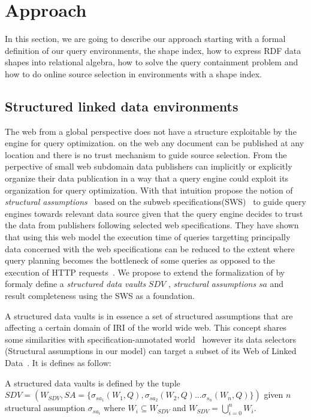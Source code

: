 \section{Approach}

In this section, we are going to describe our approach starting with a formal definition of our query environments,
the shape index, how to express RDF data shapes into relational algebra, how to solve the query containment problem
and how to do online source selection in environments with a shape index.

\subsection{Structured linked data environments}
The web from a global perspective does not have a structure exploitable by the engine for query optimization.
on the web any document can be published at any location and there is no trust mechanism to guide source selection.
From the perpective of small web subdomain data publishers can implicitly or explicitly organize their data publication in a way that a query engine could exploit 
its organization for query optimization.
With that intuition \citeauthor{Taelman2023} propose the notion of \emph{structural assumptions}~\cite{Taelman2023} based on the subweb specifications(SWS)~\cite{Bogaerts2021LinkTW}
to guide query engines towards relevant data source given that the query engine decides to trust the data from publishers following selected web specifications.
They have shown that using this web model the execution time of queries targetting principally data concerned with the web specifications can 
be reduced to the extent where query planning becomes the bottleneck of some queries as opposed to the execution of HTTP requests~\cite{Taelman2023}.
We propose to extend the formalization of \citeauthor{Taelman2023} by formaly define a \emph{structured data vaults} $SDV$ , \emph{structural assumptions} $sa$ and result completeness 
using the SWS as a foundation.

A structured data vaults is in essence a set of structured assumptions that are affecting a certain domain of IRI of the world wide web.
This concept shares some similarities with specification-annotated world~\cite{Bogaerts2021LinkTW} however its data selectors (Structural assumptions in our model) can target a subset of
its Web of Linked Data~\cite{Bogaerts2021LinkTW}.
It is defines as follow:

\begin{definition}\label{def:structuredDataVaults}
A structured data vaults is defined by the tuple~\newline $SDV = (W_{SDV}, SA = \{\sigma_{sa_1}(W_1, Q), \sigma_{sa_2}(W_2, Q)...\sigma_{s_n}(W_n, Q)\})$ given 
$n$ structural assumption $\sigma_{sa_i}$ where $W_i  \subseteq W_{SDV}$ and $W_{SDV} = \bigcup_{i=0}^{n}W_i$.
\end{definition}

